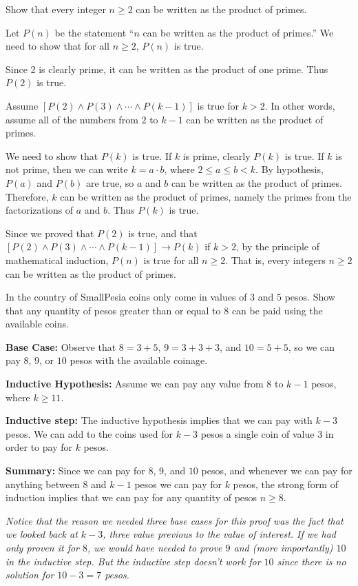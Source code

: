 \begin{exa}
Show that every integer $n\geq 2$ can be written as the product of primes.
\begin{pf}
Let $P(n)$ be the statement ``$n$ can be written as the product of primes.''
We need to show that for all $n\geq 2$, $P(n)$ is true.

Since 2 is clearly prime, it can be written as the product of one
prime.  Thus $P(2)$ is true.

Assume $[P(2)\wedge P(3)\wedge\cdots \wedge P(k-1)]$ is true for $k>2$.
In other words, assume all of the numbers from $2$ to $k-1$ can be written as the product of primes.

We need to show that $P(k)$ is true. 
If $k$ is prime, clearly $P(k)$ is true.  If $k$ is not prime,
then we can write $k=a\cdot b$, where $2\leq a\leq b< k.$
By hypothesis, $P(a)$ and $P(b)$ are true, so $a$ and $b$ can be written as the product of primes.
Therefore, $k$ can be written as the product of primes, namely the primes from the
factorizations of $a$ and $b$. Thus $P(k)$ is true.

Since we proved that $P(2)$ is true, and that
$[P(2)\wedge P(3)\wedge\cdots\wedge P(k-1)]\rightarrow P(k)$ if $k> 2$,
by the principle of mathematical induction, $P(n)$ is true for all $n\geq 2$.
That is, every integers $n\geq 2$ can be written as the product of primes.
\end{pf}
\end{exa}


\begin{exa}
In the country of SmallPesia coins only come in values of $3$ and
$5$ pesos. Show that any quantity of pesos greater than or equal
to $8$ can be paid using the available coins.
\begin{pf}
{\bf Base Case:} Observe that $8 = 3 + 5$, $9 = 3 + 3 + 3$, and $10 = 5 + 5$, 
so we can pay $8$, $9$, or $10$ pesos with the available coinage.

{\bf Inductive Hypothesis:} Assume we can pay any value from $8$ to $k-1$ pesos, where
$k\geq 11$.  

{\bf Inductive step:}
The inductive hypothesis implies that we can pay with $k-3$ pesos.
We can add to the coins used for $k-3$ pesos a single coin of value
$3$ in order to pay for $k$ pesos.

{\bf Summary:}
Since we can pay for $8$, $9$, and $10$ pesos, and whenever we can pay
for anything between $8$ and $k-1$ pesos we can pay for $k$ pesos, the
strong form of induction implies that we can pay for any quantity of
pesos $n\geq 8$.

{\em 
Notice that the reason we needed three base cases for this proof was
the fact that we looked back at $k-3$, three value previous to the value of
interest.  If we had only proven it for $8$, we would have needed to
prove $9$ and (more importantly) $10$ in the inductive step.  
But the inductive step doesn't work for $10$ since there is no solution for $10-3=7$ pesos.
}
\end{pf}
\end{exa}

